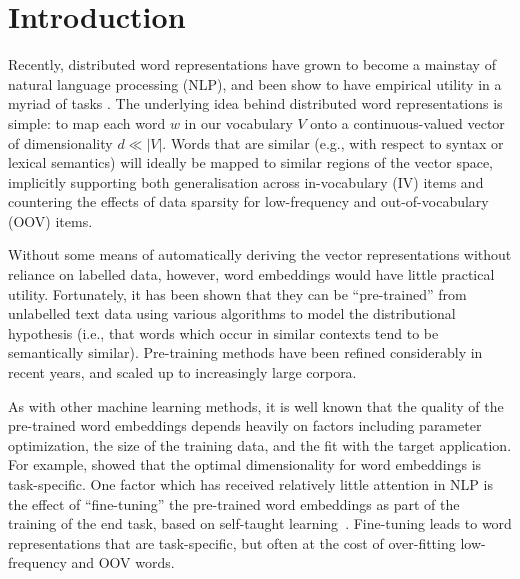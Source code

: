 \section{Introduction}

Recently, distributed word representations have grown to become a
mainstay of natural language processing (NLP), and been show to have
empirical utility in a myriad of tasks
\cite{Collobert2008,turian2010word,baroni:2014,Andreas:Klein:2014}.  The
underlying idea behind distributed word representations is simple: to
map each word $w$ in our vocabulary $V$ onto a continuous-valued vector
of dimensionality $d \ll |V|$.  Words that are similar
(e.g., with respect to syntax or lexical semantics) will ideally be mapped to
similar regions of the vector space, implicitly supporting both
generalisation across in-vocabulary (IV) items and countering the
effects of data sparsity for low-frequency and out-of-vocabulary (OOV)
items.

Without some means of automatically deriving the vector representations
without reliance on labelled data, however, word embeddings would have
little practical utility. Fortunately, it has been shown that they can
be ``pre-trained'' from unlabelled text data using various algorithms 
to model the distributional hypothesis (i.e., that
words which occur in similar contexts tend to be semantically
similar). Pre-training methods have been refined considerably in recent
years, and scaled up to increasingly large corpora.

As with other machine learning methods, it is well known that the
quality of the pre-trained word embeddings depends heavily on factors
including parameter optimization, the size of the training data, and the
fit with the target application. For example, 
showed that the optimal dimensionality for word embeddings is task-specific.  
One factor which has received relatively little attention in
NLP is the effect of ``fine-tuning'' the pre-trained word embeddings as
part of the training of the end task, based on self-taught
learning~\cite{raina2007self}.  Fine-tuning leads to word
representations that are task-specific, but often at the cost of
over-fitting low-frequency and OOV words.


